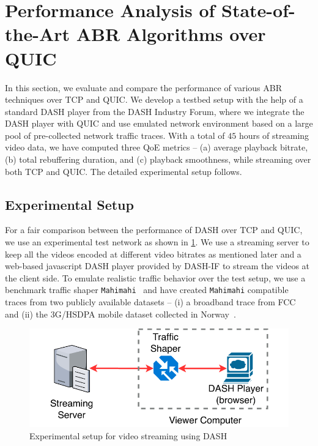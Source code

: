 \section{Performance Analysis of State-of-the-Art ABR Algorithms over QUIC}
\label{chap04:sec:qui-dash}
In this section, we evaluate and compare the performance of various ABR
techniques over \ac{TCP} and \ac{QUIC}. We develop a testbed setup with the help of a standard DASH player from the \ac{DASH} Industry Forum, where we integrate the \ac{DASH} player with \ac{QUIC} and use emulated network environment based on a large pool of pre-collected network traffic traces. With a total of $45$ hours of streaming video data, we have computed three \ac{QoE} metrics -- (a) average playback bitrate, (b) total rebuffering duration, and (c) playback smoothness, while streaming over both \ac{TCP} and \ac{QUIC}. The detailed experimental setup follows. 

\subsection{Experimental Setup}
\label{chap03s2:sec:experimentalSetup}
For a fair comparison between the performance of \ac{DASH} over \ac{TCP} and \ac{QUIC},
we use an experimental test network as shown in \fig\ref{fig:chap03s2:expeirmental_setup}. We use a streaming server to keep all the videos encoded at different video bitrates as mentioned later and a web-based javascript DASH player provided by \ac{DASH-IF} to stream the videos at the client side. To emulate realistic traffic behavior over the test setup, we use a benchmark traffic shaper {\tt Mahimahi}~\cite{mahimahi} and have created {\tt Mahimahi} compatible traces from two publicly available datasets -- (i) a broadband trace from FCC~\cite{dataset-fcc} and (ii) the 3G/HSDPA mobile dataset collected in Norway~\cite{dataset-norway}.

\begin{figure}[h]
	\centering
	\includegraphics[width=0.8\linewidth]{img/experimental_setup}
	\caption{\label{fig:chap03s2:expeirmental_setup}Experimental setup for video streaming using DASH}
\end{figure}

